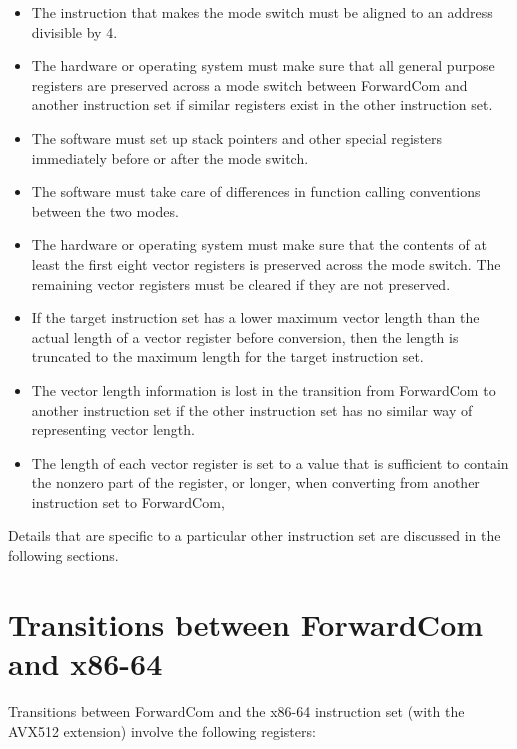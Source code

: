 \documentclass[forwardcom.tex]{subfiles}
\begin{document}
\begin{itemize}
\item The instruction that makes the mode switch must be aligned to an address divisible by 4.

\item The hardware or operating system must make sure that all general purpose registers are preserved across a mode switch between ForwardCom and another instruction set if similar registers exist in the other instruction set.

\item The software must set up stack pointers and other special registers immediately before or after the mode switch.

\item The software must take care of differences in function calling conventions between the two modes.

\item The hardware or operating system must make sure that the contents of at least the first eight vector registers is preserved across the mode switch. The remaining vector registers must be cleared if they are not preserved.

\item If the target instruction set has a lower maximum vector length than the actual length of a vector register before conversion, then the length is truncated to the maximum length for the target instruction set.

\item The vector length information is lost in the transition from ForwardCom to another instruction set if the other instruction set has no similar way of representing vector length.

\item The length of each vector register is set to a value that is sufficient to contain the nonzero part of the register, or longer, when converting from another instruction set to ForwardCom, 

\end{itemize}

Details that are specific to a particular other instruction set are discussed in the following sections.

\section{Transitions between ForwardCom and x86-64}
Transitions between ForwardCom and the x86-64 instruction set (with the AVX512 extension) involve the following registers:
\end{document}
